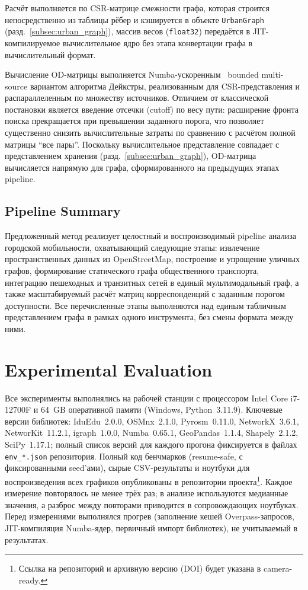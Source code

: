 \documentclass[sigconf,nonacm]{acmart}
\begin{document}
    Расчёт выполняется по CSR-матрице смежности графа, которая строится непосредственно из таблицы рёбер и кэшируется
    в объекте \texttt{UrbanGraph} (разд.~\ref{subsec:urban_graph}), массив весов (\texttt{float32}) передаётся в JIT-компилируемое
    вычислительное ядро без этапа конвертации графа в вычислительный формат.

    Вычисление OD-матрицы выполняется Numba-ускоренным~\cite{lam2015numba} bounded multi-source вариантом алгоритма Дейкстры,
    реализованным для CSR-представления и распараллеленным по множеству источников.
    Отличием от классической постановки является введение отсечки (cutoff) по весу пути: расширение фронта поиска прекращается при превышении заданного порога,
    что позволяет существенно снизить вычислительные затраты по сравнению с расчётом полной матрицы ``все пары''.
    Поскольку вычислительное представление совпадает с представлением хранения (разд.~\ref{subsec:urban_graph}),
    OD-матрица вычисляется напрямую для графа, сформированного на предыдущих этапах pipeline.

    \subsection{Pipeline Summary}
    \label{subsec:pipeline-summary}

    Предложенный метод реализует целостный и воспроизводимый pipeline анализа городской мобильности,
    охватывающий следующие этапы: извлечение пространственных данных из OpenStreetMap, построение и упрощение уличных графов,
    формирование статического графа общественного транспорта, интеграцию пешеходных и транзитных сетей в единый мультимодальный граф,
    а также масштабируемый расчёт матриц корреспонденций с заданным порогом доступности.
    Все перечисленные этапы выполняются над единым табличным представлением графа в рамках одного инструмента, без смены формата между ними.


    \section{Experimental Evaluation}
    \label{sec:experiments}

    Все эксперименты выполнялись на рабочей станции с процессором Intel Core i7-12700F и 64~GB оперативной памяти (Windows, Python~3.11.9).
    Ключевые версии библиотек: IduEdu~2.0.0, OSMnx~2.1.0, Pyrosm~0.11.0, NetworkX~3.6.1, NetworKit~11.2.1, igraph~1.0.0, Numba~0.65.1, GeoPandas~1.1.4, Shapely~2.1.2, SciPy~1.17.1;
    полный список версий для каждого прогона фиксируется в файлах \texttt{env\_*.json} репозитория.
    Полный код бенчмарков (resume-safe, с фиксированными seed'ами), сырые CSV-результаты и ноутбуки для воспроизведения
    всех графиков опубликованы в репозитории проекта\footnote{Ссылка на репозиторий и архивную версию (DOI) будет указана в camera-ready.}.
    Каждое измерение повторялось не менее трёх раз; в анализе используются медианные значения, а разброс между повторами
    приводится в сопровождающих ноутбуках.
    Перед измерениями выполнялся прогрев (заполнение кешей Overpass-запросов, JIT-компиляция Numba-ядер, первичный импорт библиотек), не учитываемый в результатах.
\end{document}
